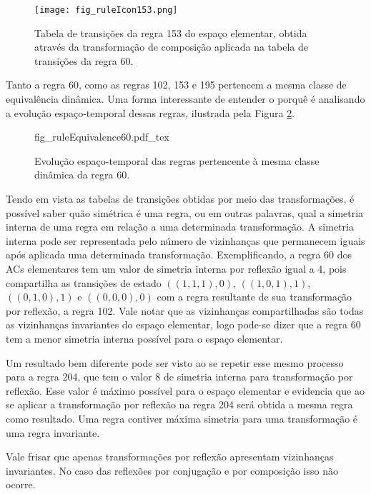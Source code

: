 	\begin{figure}[h!]
	  \centering
	  \texttt{[image: fig\_ruleIcon153.png]}
	  \caption{Tabela de transições da regra 153 do espaço elementar, obtida através da transformação de composição aplicada na tabela de transições da regra 60.}
	  \label{fig:table153}
	\end{figure}

Tanto a regra 60, como as regras 102, 153 e 195 pertencem a mesma classe de equivalência dinâmica. Uma forma interessante de entender o porquê é analisando a evolução espaço-temporal dessas regras, ilustrada pela Figura \ref{fig:dynamicEquivalecy}.

	\begin{figure}[h!]
	  \centering
	  \def\svgscale{0.63}
	  {fig_ruleEquivalence60.pdf_tex}
	  \caption{Evolução espaço-temporal das regras pertencente à mesma classe dinâmica da regra 60.}
	  \label{fig:dynamicEquivalecy}
	\end{figure}

Tendo em vista as tabelas de transições obtidas por meio das transformações, é possível saber quão simétrica é uma regra, ou em outras palavras, qual a simetria interna de uma regra em relação a uma determinada transformação. A simetria interna pode ser representada pelo número de vizinhanças que permanecem iguais após aplicada uma determinada transformação. Exemplificando, a regra 60 dos ACs elementares tem um valor de simetria interna por reflexão igual a 4, pois compartilha as transições de estado $((1,1,1),0)$, $((1,0,1),1)$, $((0,1,0),1)$ e $ ((0,0,0),0)$ com a regra resultante de sua transformação por reflexão, a regra 102. Vale notar que as vizinhanças compartilhadas são todas as vizinhanças invariantes do espaço elementar, logo pode-se dizer que a regra 60 tem a menor simetria interna possível para o espaço elementar.

Um resultado bem diferente pode ser visto ao se repetir esse mesmo processo para a regra 204, que tem o valor 8 de simetria interna para transformação por reflexão. Esse valor é máximo possível para o espaço elementar e evidencia que ao se aplicar a transformação por reflexão na regra 204 será obtida a mesma regra como resultado. Uma regra contiver máxima simetria para uma transformação é uma regra invariante.

Vale frisar que apenas transformações por reflexão apresentam vizinhanças invariantes. No caso das reflexões por conjugação e por composição isso não ocorre.

